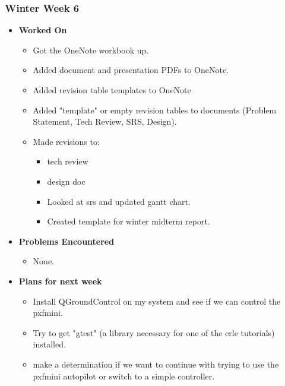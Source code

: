 \documentclass{article}
\begin{document}
\subsubsection{Winter Week 6}
\begin{itemize}
    \item {\textbf{Worked On}}
    \begin{itemize}
        \item Got the OneNote workbook up.
        \item Added document and presentation PDFs to OneNote.
        \item Added revision table templates to OneNote
        \item Added "template" or empty revision tables to documents (Problem Statement, Tech Review, SRS, Design).
        \item Made revisions to:
        \begin{itemize}
            \item tech review
            \item design doc
            \item Looked at srs and updated gantt chart.
            \item Created template for winter midterm report.
        \end{itemize}
    \end{itemize}

    \item {\textbf{Problems Encountered}}
    \begin{itemize}
        \item None.
    \end{itemize}

    \item{\textbf{Plans for next week}}
    \begin{itemize}
        \item Install QGroundControl on my system and see if we can control the pxfmini.
        \item Try to get "gtest" (a library necessary for one of the erle tutorials) installed.
        \item make a determination if we want to continue with trying to use the pxfmini autopilot or switch to a simple controller.
    \end{itemize}
\end{itemize}
\end{document}
